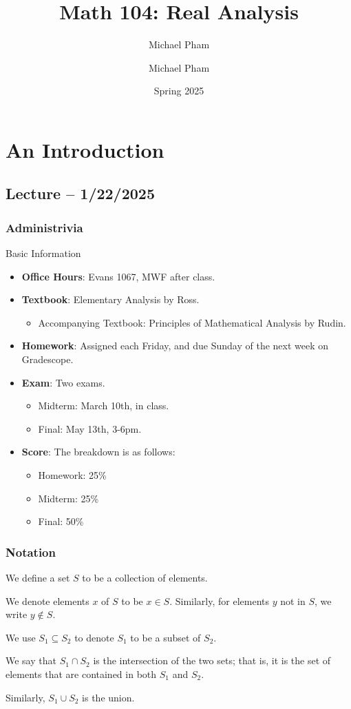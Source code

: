 \documentclass[openany]{book}
\title{#1}
\author{Michael Pham}
\date{#2}
\renewcommand{\mytitle}[2]{%
	\title{#1}
	\author{Michael Pham}
	\date{#2}
	\maketitle
	\newpage
	\mytoc
	\newpage
}
\begin{document}
\mytitle{Math 104: Real Analysis}{Spring 2025}

\chapter{An Introduction}
\section{Lecture -- 1/22/2025}
\subsection{Administrivia}
\begin{miscbox}{Basic Information}
	\begin{itemize}
		\item \textbf{Office Hours}: Evans 1067, MWF after class.
		\item \textbf{Textbook}: Elementary Analysis by Ross.
		\begin{itemize}
			\item Accompanying Textbook: Principles of Mathematical Analysis by Rudin.
		\end{itemize}
		\item \textbf{Homework}: Assigned each Friday, and due Sunday of the next week on Gradescope.
		\item \textbf{Exam}: Two exams.
		\begin{itemize}
			\item Midterm: March 10th, in class.
			\item Final: May 13th, 3-6pm.
		\end{itemize}
		\item \textbf{Score}: The breakdown is as follows:
		\begin{itemize}
			\item Homework: 25\%
			\item Midterm: 25\%
			\item Final: 50\%
		\end{itemize}
	\end{itemize}
\end{miscbox}

\subsection{Notation}
\begin{defn}
	We define a set $S$ to be a collection of elements.
	
	We denote elements $x$ of $S$ to be $x \in S$. Similarly, for elements $y$ not in $S$, we write $y \not\in S$.
\end{defn}
\begin{defn}
	We use $S_1 \subseteq S_2$ to denote $S_1$ to be a subset of $S_2$.
	
	We say that $S_1 \cap S_2$ is the intersection of the two sets; that is, it is the set of elements that are contained in both $S_1$ and $S_2$.
	
	Similarly, $S_1 \cup S_2$ is the union.
\end{defn}
\end{document}
